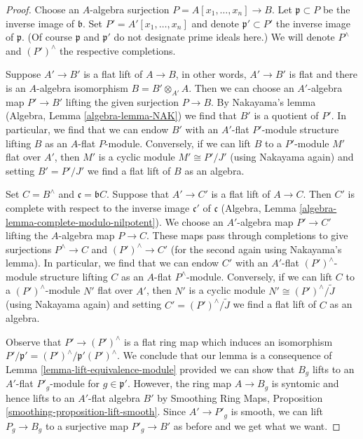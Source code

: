 \documentclass{stacks-project}
\theoremstyle{plain}
\theoremstyle{definition}
\theoremstyle{remark}
\numberwithin{equation}{subsection}
\begin{document}
\begin{proof}
Choose an $A$-algebra surjection $P = A[x_1, \ldots, x_n] \to B$.
Let $\mathfrak p \subset P$ be the inverse image of $\mathfrak b$.
Set $P' = A'[x_1, \ldots, x_n]$ and denote $\mathfrak p' \subset P'$
the inverse image of $\mathfrak p$. (Of course $\mathfrak p$
and $\mathfrak p'$ do not designate prime ideals here.)
We will denote $P^\wedge$ and $(P')^\wedge$ the respective completions.

\medskip\noindent
Suppose $A' \to B'$ is a flat lift of $A \to B$, in other words,
$A' \to B'$ is flat and there is an $A$-algebra isomorphism
$B = B' \otimes_{A'} A$. Then we can choose an $A'$-algebra map
$P' \to B'$ lifting the given surjection $P \to B$.
By Nakayama's lemma (Algebra, Lemma \ref{algebra-lemma-NAK})
we find that $B'$ is a quotient of $P'$. In particular, we find
that we can endow $B'$ with an $A'$-flat $P'$-module structure
lifting $B$ as an $A$-flat $P$-module.
Conversely, if we can lift $B$ to a $P'$-module $M'$ flat over $A'$,
then $M'$ is a cyclic module $M' \cong P'/J'$ (using Nakayama again)
and setting $B' = P'/J'$ we find a flat lift of $B$ as an algebra.

\medskip\noindent
Set $C = B^\wedge$ and $\mathfrak c = \mathfrak bC$.
Suppose that $A' \to C'$ is a flat lift of $A \to C$.
Then $C'$ is complete with respect to the inverse image $\mathfrak c'$
of $\mathfrak c$
(Algebra, Lemma \ref{algebra-lemma-complete-modulo-nilpotent}).
We choose an $A'$-algebra map $P' \to C'$ lifting
the $A$-algebra map $P \to C$. These maps pass through
completions to give surjections $P^\wedge \to C$ and $(P')^\wedge \to C'$
(for the second again using Nakayama's lemma).
In particular, we find that we can endow $C'$ with an $A'$-flat
$(P')^\wedge$-module structure lifting $C$ as an $A$-flat $P^\wedge$-module.
Conversely, if we can lift $C$ to a $(P')^\wedge$-module $N'$ flat over $A'$,
then $N'$ is a cyclic module $N' \cong (P')^\wedge/\tilde J$
(using Nakayama again) and setting $C' = (P')^\wedge/\tilde J$
we find a flat lift of $C$ as an algebra.

\medskip\noindent
Observe that $P' \to (P')^\wedge$ is a flat ring map which
induces an isomorphism $P'/\mathfrak p' = (P')^\wedge/\mathfrak p'(P')^\wedge$.
We conclude that our lemma is a consequence of
Lemma \ref{lemma-lift-equivalence-module} provided we can
show that $B_g$ lifts to an $A'$-flat $P'_g$-module for
$g \in \mathfrak p'$. However, the ring map $A \to B_g$ is syntomic
and hence lifts to an $A'$-flat algebra $B'$ by
Smoothing Ring Maps, Proposition \ref{smoothing-proposition-lift-smooth}.
Since $A' \to P'_g$ is smooth, we can lift $P_g \to B_g$
to a surjective map $P'_g \to B'$ as before and we get what we want.
\end{proof}
\end{document}
